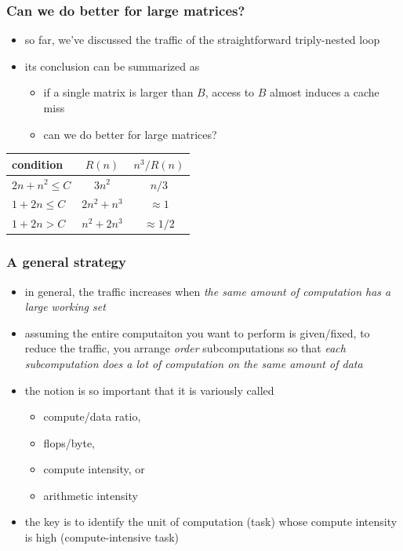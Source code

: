 \documentclass[12pt,dvipdfmx]{beamer}
\newcommand{\ao}[1]{{\color{blue}#1}}
\begin{document}
\begin{frame}
\frametitle{Can we do better for large matrices?}
\begin{itemize}
\item so far, we've discussed the traffic of the straightforward triply-nested loop
\item its conclusion can be summarized as
\begin{itemize}
  \item if a single matrix is larger than $B$,
    access to $B$ almost induces a cache miss
\item can we do better for large matrices?    
\end{itemize}
\end{itemize}

\begin{center}
\begin{tabular}{|l|c|c|}\hline
condition         & $R(n)$       & $n^3/R(n)$ \\\hline
$2n + n^2 \leq C$ & $3n^2$       & $n/3$ \\
$1 + 2n \leq C$   & $2n^2 + n^3$ & $\approx 1$ \\ 
$1 + 2n > C$      & $n^2 + 2n^3$ & $\approx 1/2$ \\\hline
\end{tabular}
\end{center}
\end{frame}
  
\begin{frame}
\frametitle{A general strategy}
\begin{itemize}
\item<1-> in general, the traffic increases when 
  \ao{\emph{the same amount of computation has a large working set}}
\item<2-> assuming the entire computaiton you want to perform is given/fixed,
  to reduce the traffic, you arrange \ao{\it order} subcomputations
  so that \ao{\emph{each subcomputation does a lot of computation
    on the same amount of data}}
\item<3-> the notion is so important that it is variously called
  \begin{itemize}
  \item \ao{compute/data ratio,}
  \item \ao{flops/byte,} 
  \item \ao{compute intensity,} or
  \item \ao{arithmetic intensity}
  \end{itemize}
\item<4-> the key is to identify the unit of computation (task) 
  whose compute intensity is high \ao{(compute-intensive task)}
\end{itemize}
\end{frame}
\end{document}
